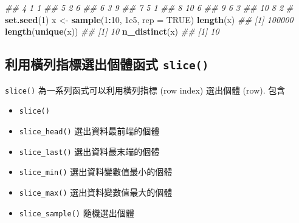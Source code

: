 \documentclass[
]{book}
\newenvironment{Shaded}{\begin{snugshade}}{\end{snugshade}}
\newcommand{\CommentTok}[1]{\textcolor[rgb]{0.56,0.35,0.01}{\textit{#1}}}
\newcommand{\DataTypeTok}[1]{\textcolor[rgb]{0.13,0.29,0.53}{#1}}
\newcommand{\DecValTok}[1]{\textcolor[rgb]{0.00,0.00,0.81}{#1}}
\newcommand{\FloatTok}[1]{\textcolor[rgb]{0.00,0.00,0.81}{#1}}
\newcommand{\KeywordTok}[1]{\textcolor[rgb]{0.13,0.29,0.53}{\textbf{#1}}}
\newcommand{\NormalTok}[1]{#1}
\newcommand{\OperatorTok}[1]{\textcolor[rgb]{0.81,0.36,0.00}{\textbf{#1}}}
\newcommand{\OtherTok}[1]{\textcolor[rgb]{0.56,0.35,0.01}{#1}}
\newcommand{\StringTok}[1]{\textcolor[rgb]{0.31,0.60,0.02}{#1}}
\providecommand{\tightlist}{%
  \setlength{\itemsep}{0pt}\setlength{\parskip}{0pt}}
\begin{document}
\begin{Shaded}
\begin{Highlighting}[]
\CommentTok{\#\#  4     1     1}
\CommentTok{\#\#  5     2     6}
\CommentTok{\#\#  6     3     9}
\CommentTok{\#\#  7     5     1}
\CommentTok{\#\#  8    10     6}
\CommentTok{\#\#  9     6     3}
\CommentTok{\#\# 10     8     2}
\CommentTok{\#}
\KeywordTok{set.seed}\NormalTok{(}\DecValTok{1}\NormalTok{)}
\NormalTok{x \textless{}{-}}\StringTok{ }\KeywordTok{sample}\NormalTok{(}\DecValTok{1}\OperatorTok{:}\DecValTok{10}\NormalTok{, }\FloatTok{1e5}\NormalTok{, }\DataTypeTok{rep =} \OtherTok{TRUE}\NormalTok{)}
\KeywordTok{length}\NormalTok{(x)}
\CommentTok{\#\# [1] 100000}
\KeywordTok{length}\NormalTok{(}\KeywordTok{unique}\NormalTok{(x))}
\CommentTok{\#\# [1] 10}
\KeywordTok{n\_distinct}\NormalTok{(x)}
\CommentTok{\#\# [1] 10}
\end{Highlighting}
\end{Shaded}

\hypertarget{ux5229ux7528ux6a6bux5217ux6307ux6a19ux9078ux51faux500bux9ad4ux51fdux5f0f-slice}{%
\subsection{\texorpdfstring{利用橫列指標選出個體函式 \texttt{slice()}}{利用橫列指標選出個體函式 slice()}}\label{ux5229ux7528ux6a6bux5217ux6307ux6a19ux9078ux51faux500bux9ad4ux51fdux5f0f-slice}}

\texttt{slice()} 為一系列函式可以利用橫列指標 (row index)
選出個體 (row). 包含

\begin{itemize}
\tightlist
\item
  \texttt{slice()}~\\
\item
  \texttt{slice\_head()} 選出資料最前端的個體
\item
  \texttt{slice\_last()} 選出資料最末端的個體
\item
  \texttt{slice\_min()} 選出資料變數值最小的個體
\item
  \texttt{slice\_max()} 選出資料變數值最大的個體
\item
  \texttt{slice\_sample()} 隨機選出個體
\end{itemize}
\end{document}
